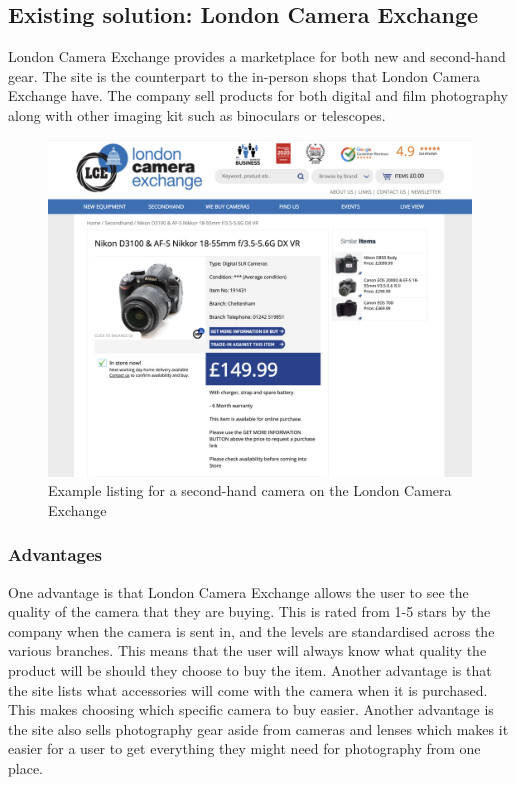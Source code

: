 \subsection{Existing solution: London Camera Exchange \parencite{lcegroup}}
London Camera Exchange provides a marketplace for both new and second-hand gear. The site is the counterpart to the in-person shops that London Camera Exchange have. The company sell products for both digital and film photography along with other imaging kit such as binoculars or telescopes.
\begin{figure}[H]
    \centering
    \includegraphics[scale=0.27]{ch1_analysis/lce_listing.png}
    \caption{Example listing for a second-hand camera on the London Camera Exchange}
    \label{fig:ch1_lce}
\end{figure}
\subsubsection{Advantages}
One advantage is that London Camera Exchange allows the user to see the quality of the camera that they are buying. This is rated from 1-5 stars by the company when the camera is sent in, and the levels are standardised across the various branches. This means that the user will always know what quality the product will be should they choose to buy the item. Another advantage is that the site lists what accessories will come with the camera when it is purchased. This makes choosing which specific camera to buy easier. Another advantage is the site also sells photography gear aside from cameras and lenses which makes it easier for a user to get everything they might need for photography from one place.
